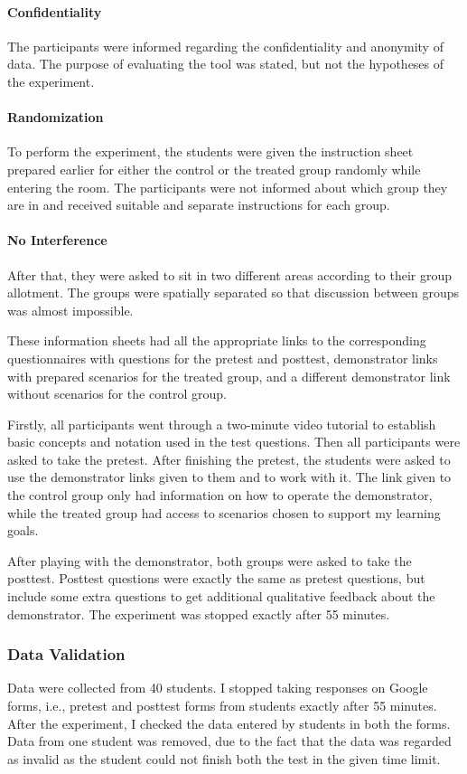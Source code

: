 \paragraph{Confidentiality} The participants were informed regarding the confidentiality and anonymity of data. The purpose of evaluating the tool was stated, but not the hypotheses of the experiment.

\paragraph{Randomization} To perform the experiment, the students were given the instruction sheet prepared earlier for either the control or the treated group randomly while entering the room. The participants were not informed about which group they are in and received suitable and separate instructions for each group.

\paragraph{No Interference} After that, they were asked to sit in two different areas according to their group allotment. The groups were spatially separated so that discussion between groups was almost impossible.

These information sheets had all the appropriate links to the corresponding questionnaires with questions for the pretest and posttest, demonstrator links with prepared scenarios for the treated group, and a different demonstrator link without scenarios for the control group.

Firstly, all participants went through a two-minute video tutorial to establish basic concepts and notation used in the test questions. Then all participants were asked to take the pretest. After finishing the pretest, the students were asked to use the demonstrator links given to them and to work with it. The link given to the control group only had information on how to operate the demonstrator, while the treated group had access to scenarios chosen to support my learning goals. 

After playing with the demonstrator, both groups were asked to take the posttest. Posttest questions were exactly the same as pretest questions, but include some extra questions to get additional qualitative feedback about the demonstrator. The experiment was stopped exactly after 55 minutes.

\subsubsection{Data Validation}\label{subsubsec:datavalidation}
Data were collected from 40 students. I stopped taking responses on Google forms, i.e., pretest and posttest forms from students exactly after 55 minutes. After the experiment, I checked the data entered by students in both the forms. Data from one student was removed, due to the fact that the data was regarded as invalid as the student could not finish both the test in the given time limit.

